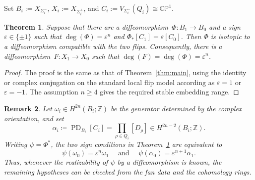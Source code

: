 \documentclass[10pt,a4paper]{amsart}
\newtheorem{theorem}{Theorem}[section]
\numberwithin{equation}{section}
\newtheorem{remark}[theorem]{Remark}
\newcommand{\Z}{\mathbb Z}
\newcommand{\CP}{\mathbb{CP}}
\newcommand{\wideand}{ \quad \text{ and } \quad }
\DeclareMathOperator{\PD}{PD}
\begin{document}
Set $B_i:=X_{\Sigma_i^-}$, $X_i:=X_{\Sigma_i^+}$, and $C_i:=V_{\Sigma_i^-}(Q_i)\cong\CP^1$.


\begin{theorem}\label{thm:criterion_flip}
    Suppose that there are a diffeomorphism~$\Phi\colon B_1\to B_0$ and a sign~$\varepsilon\in\{\pm1\}$ such that $\deg(\Phi)=\varepsilon^n$ and $\Phi_*[C_1]=\varepsilon[C_0]$.
    Then $\Phi$ is isotopic to a diffeomorphism compatible with the two flips. 
    Consequently, there is a diffeomorphism~$F\colon X_1\to X_0$ such that $\deg(F)=\deg(\Phi)=\varepsilon^n$.
\end{theorem}

\begin{proof}
    The proof is the same as that of Theorem~\ref{thm:main}, using the identity or complex conjugation on the standard local flip model according as $\varepsilon=1$ or $\varepsilon=-1$. 
    The assumption $n\ge 4$ gives the required stable embedding range.
\end{proof}


\begin{remark}
    Let $\omega_i\in H^{2n}(B_i;\Z)$ be the generator determined by the complex orientation, and set
    $$
        \alpha_i \coloneq \PD_{B_i}[C_i] = \prod_{\rho\in Q_i}[D_\rho] \in H^{2n-2}(B_i;\Z).
    $$
    Writing $\psi=\Phi^*$, the two sign conditions in Theorem~\ref{thm:criterion_flip} are equivalent to
    $$
        \psi(\omega_0)=\varepsilon^n\omega_1 \wideand \psi(\alpha_0)=\varepsilon^{n+1}\alpha_1.
    $$
    Thus, whenever the realizability of $\psi$ by a diffeomorphism is known, the remaining hypotheses can be checked from the fan data and the cohomology rings.
\end{remark}
\end{document}
